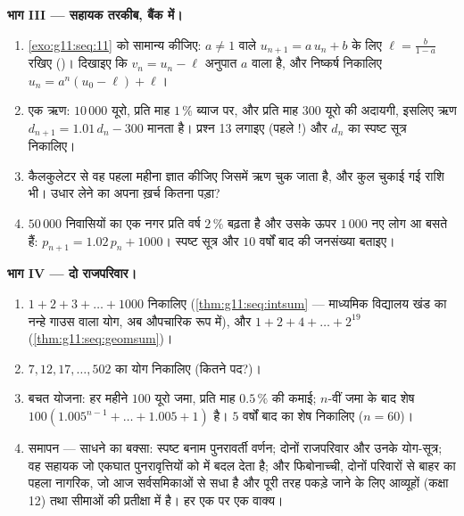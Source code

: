 \begin{problem}
\medskip
\noindent\textbf{भाग III --- सहायक तरकीब, बैंक में।}
\begin{enumerate}[resume]
  \item \cref{exo:g11:seq:11} को सामान्य कीजिए: $a \neq 1$ वाले $u_{n+1} = a\,u_n + b$ के लिए $\ell = \frac{b}{1 - a}$ रखिए ()। दिखाइए कि $v_n = u_n - \ell$ अनुपात $a$ वाला  है, और निष्कर्ष
        निकालिए
        $u_n = a^n (u_0 - \ell) + \ell$।
  \item एक ऋण: $10\,000$ यूरो, प्रति माह $1\,\%$ ब्याज पर, और प्रति माह $300$
        यूरो की अदायगी, इसलिए ऋण $d_{n+1} = 1.01\,d_n - 300$ मानता है। प्रश्न 13 लगाइए (पहले
        !) और $d_n$ का स्पष्ट सूत्र निकालिए।
  \item कैलकुलेटर से वह पहला महीना ज्ञात कीजिए जिसमें ऋण चुक जाता है, और
        कुल चुकाई गई राशि भी। उधार लेने का अपना ख़र्च कितना पड़ा?
  \item $50\,000$ निवासियों का एक नगर प्रति वर्ष $2\,\%$ बढ़ता है और उसके ऊपर
        $1\,000$ नए लोग आ बसते हैं: $p_{n+1} = 1.02\,p_n + 1000$। स्पष्ट सूत्र और $10$ वर्षों बाद की
        जनसंख्या बताइए।
\end{enumerate}

\medskip
\noindent\textbf{भाग IV --- दो राजपरिवार।}
\begin{enumerate}[resume]
  \item $1 + 2 + 3 + \dots + 1000$ निकालिए (\cref{thm:g11:seq:intsum} --- माध्यमिक विद्यालय खंड का नन्हे गाउस वाला
        योग, अब औपचारिक रूप में), और $1 + 2 + 4 + \dots + 2^{19}$ (\cref{thm:g11:seq:geomsum})।
  \item {} $7, 12, 17, \dots, 502$ का योग निकालिए (कितने पद?)।
  \item बचत योजना: हर महीने $100$ यूरो जमा, प्रति माह $0.5\,\%$ की कमाई; $n$-वीं
        जमा के बाद शेष $100\left(1.005^{n-1} + \dots + 1.005 + 1\right)$ है। $5$ वर्षों बाद का शेष निकालिए ($n = 60$)।
  \item समापन ---  साधने का बक्सा: स्पष्ट बनाम पुनरावर्ती वर्णन;
        दोनों राजपरिवार और उनके योग-सूत्र; वह सहायक  जो एकघात
        पुनरावृत्तियों को  में बदल देता है; और फिबोनाच्ची, दोनों
        परिवारों से बाहर का पहला नागरिक, जो आज सर्वसमिकाओं से सधा है और
        पूरी तरह पकड़े जाने के लिए आव्यूहों (कक्षा 12) तथा सीमाओं की
        प्रतीक्षा में है। हर एक पर एक वाक्य।
\end{enumerate}
\end{problem}
